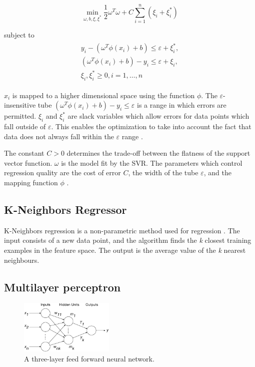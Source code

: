 \documentclass[final,3p,times,twocolumn,numbers]{elsarticle}
\begin{document}
\begin{equation}
\min_{\omega,b,\xi,\xi^{*}}\frac{1}{2}\omega^T\omega+C\sum_{i=1}^{n}(\xi_i+\xi_i^*)
\end{equation}

\noindent subject to
\begin{align}
\begin{multlined}
\label{svr:constrains}
y_i-(\omega^T\phi(x_i)+b)\leq\varepsilon+\xi_i^{*},\\
(\omega^T\phi(x_i)+b)-y_i\leq\varepsilon+\xi_i,\\
\xi_i,\xi^*_i\geq0,i=1,\ldots,n
\end{multlined}
\end{align}

\noindent $x_i$ is mapped to a higher dimensional space using the function $\phi$. The $\varepsilon$-insensitive tube $(\omega^T\phi(x_i)+b)-y_i\leq\varepsilon$ is a range in which errors are permitted. $\xi_i$ and $\xi^*_i$ are slack variables which allow errors for data points which fall outside of $\varepsilon$. This enables the optimization to take into account the fact that data does not always fall within the $\varepsilon$ range \cite{Smola2004}.

The constant $C>0$ determines the trade-off between the flatness of the support vector function. $\omega$ is the model fit by the SVR. The parameters which control regression quality are the cost of error $C$, the width of the tube $\varepsilon$, and the mapping function $\phi$ \cite{Shu2006,Chen2004}. 


\subsection{K-Neighbors Regressor}

K-Neighbors regression is a non-parametric method used for regression \cite{forgy65}. The input consists of a new data point, and the algorithm finds the \textit{k} closest training examples in the feature space. The output is the average value of the \textit{k} nearest neighbours.



\subsection{Multilayer perceptron}


\begin{figure}
\centering
    \includegraphics[width=0.4\textwidth]{figures/methods/Kell_eEnergy_Fig1.eps}
    \caption{A three-layer feed forward neural network.}
    \label{fig:mlp}
\end{figure}
\end{document}
